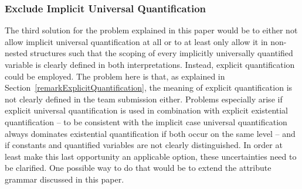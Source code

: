 \subsubsection{Exclude Implicit Universal Quantification}
The third solution for the problem explained in this paper would be 
to either not allow implicit universal quantification at all or to at least only allow it in non-nested structures such that the scoping of every implicitly universally quantified variable is clearly
defined in both interpretations. Instead, 
explicit quantification could be employed.
The problem here is that, as explained in Section~\ref{remarkExplicitQuantification},
the meaning of explicit quantification is not clearly defined in the \wwwc team submission either. Problems especially arise if explicit universal quantification is used in combination with explicit
existential quantification -- to be consistent with the implicit case universal quantification always dominates existential quantification if both occur on the same level -- and if constants and 
quantified variables are not clearly distinguished. In order at least make this last opportunity an applicable option, these uncertainties need to be clarified. One possible way to do that would be to
extend the attribute grammar discussed in this paper.

